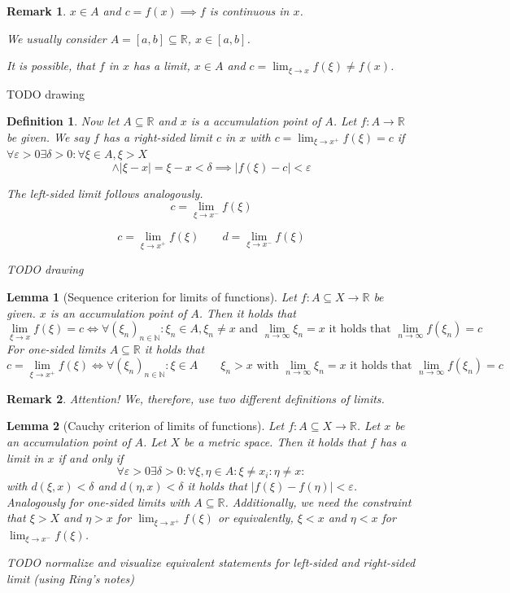 \documentclass{article}
\newtheorem{definition}{Definition}  \numberwithin{definition}{section}
\newtheorem{lemma}{Lemma}  \numberwithin{lemma}{section}
\newtheorem{remark}{Remark}  \numberwithin{remark}{section}
\newcommand{\card}[1]{\left|#1\right|}
\begin{document}
\begin{remark}
  $x \in A$ and $c = f(x) \implies f$ is continuous in $x$.

  We usually consider $A = [a,b] \subseteq \mathbb R$, $x \in [a,b]$.

  It is possible, that $f$ in $x$ has a limit, $x \in A$ and $c = \lim_{\xi\to x} f(\xi) \neq f(x)$.
\end{remark}

TODO drawing

\begin{definition}
  Now let $A \subseteq \mathbb R$ and $x$ is a accumulation point of $A$.
  Let $f: A \to \mathbb R$ be given. We say $f$ has a right-sided limit $c$ in $x$
  with $c = \lim_{\xi \to x^+} f(\xi) = c$ if $\forall \varepsilon > 0 \exists \delta > 0: \forall \xi \in A, \xi > X$
  \[ \land  \card{\xi - x} = \xi - x < \delta \implies \card{f(\xi) - c} < \varepsilon \]

  The left-sided limit follows analogously.
  \[ c = \lim_{\xi \to x^-} f(\xi) \]

  \[ c = \lim_{\xi \to x^+} f(\xi) \qquad d = \lim_{\xi \to x^-} f(\xi) \]

  TODO drawing
\end{definition}

\begin{lemma}[Sequence criterion for limits of functions] %
  \label{lemma5}
  Let $f: A \subseteq X \to \mathbb R$ be given. $x$ is an accumulation point of $A$.
  Then it holds that
  \[ \lim_{\xi \to x} f(\xi) = c \iff \forall (\xi_n)_{n\in\mathbb N}: \xi_n \in A, \xi_n \neq x \text{ and } \lim_{n\to\infty} \xi_n = x \text{ it holds that } \lim_{n\to\infty} f(\xi_n) = c \]
  For one-sided limits $A \subseteq \mathbb R$ it holds that
  \[ c = \lim_{\xi\to x^{+}} f(\xi) \iff \forall (\xi_n)_{n\in\mathbb N}: \xi \in A \qquad \xi_n > x \text{ with } \lim_{n\to\infty} \xi_n = x \text{ it holds that } \lim_{n\to\infty} f(\xi_n) = c \]
\end{lemma}

\begin{remark}
  Attention! We, therefore, use two different definitions of limits.
\end{remark}

\begin{lemma}[Cauchy criterion of limits of functions] %
  Let $f: A \subseteq X \to \mathbb R$. Let $x$ be an accumulation point of $A$.
  Let $X$ be a metric space. Then it holds that
  $f$ has a limit in $x$ if and only if
  \[ \forall \varepsilon > 0 \exists \delta > 0: \forall \xi, \eta \in A: \xi \neq x_i: \eta \neq x: \]
  with $d(\xi, x) < \delta$ and $d(\eta, x) < \delta$ it holds that $\card{f(\xi) - f(\eta)} < \varepsilon$.
  Analogously for one-sided limits with $A \subseteq \mathbb R$.
  Additionally, we need the constraint that $\xi > X$ and $\eta > x$ for $\lim_{\xi \to x^+} f(\xi)$ or equivalently,
  $\xi < x$ and $\eta < x$ for $\lim_{\xi \to x^-} f(\xi)$.

  TODO normalize and visualize equivalent statements for left-sided and right-sided limit (using Ring's notes)
\end{lemma}
\end{document}
